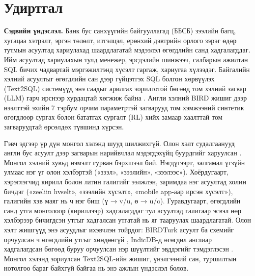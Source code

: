 
\titleformat{\section}{\Large\bfseries\filcenter}{}{0pt}{}
\section*{Удиртгал}
\titleformat{\section}{\Large\bfseries\raggedright}{\thesection}{1em}{}

\textbf{Сэдвийн үндэслэл.} Банк бус санхүүгийн байгууллагад (ББСБ) зээлийн багц, хугацаа хэтрэлт, эргэн төлөлт,
итгэлцэл, ерөнхий дэвтрийн орлого зэрэг өдөр тутмын асуултад хариулахад шаардлагатай мэдээлэл өгөгдлийн санд
хадгалагддаг. Ийм асуултад
хариулахын тулд менежер, эрсдэлийн шинжээч, салбарын ажилтан SQL бичих чадвартай мэргэжилтэнд хүсэлт гаргаж,
хариугаа хүлээдэг. Байгалийн хэлний асуултыг өгөгдлийн сан дээр гүйцэтгэх SQL болгон хөрвүүлэх (Text2SQL)
системүүд энэ саадыг арилгах зорилготой бөгөөд том хэлний загвар (LLM) гарч ирснээр хурдацтай хөгжиж байна
\cite{shi_2025_survey_llm_text2sql}. Англи хэлний BIRD жишиг \cite{li_2023_bird} дээр нээлттэй эхийн 7 тэрбум
орчим параметртэй загварууд том хэмжээний синтетик өгөгдлөөр сургах \cite{li_2025_omnisql} болон бататгах сургалт
(RL) хийх \cite{yao_2025_arctic_text2sql_r1} замаар хаалттай том загваруудтай өрсөлдөх түвшинд хүрсэн.

Гэвч эдгээр үр дүн монгол хэлэнд шууд шилжихгүй. Олон хэлт судалгаанууд англи бус асуулт дээр загварын нарийвчлал
мэдэгдэхүйц буурдгийг харуулсан \cite{dou_2023_multispider, pham_2026_multispider2}. Монгол хэлний хувьд нэмэлт
гурван бэрхшээл бий. Нэгдүгээрт, залгамал үгзүйн улмаас нэг үг олон хэлбэртэй («зээл», «зээлийн», «зээлээс»).
Хоёрдугаарт, хэрэглэгчид кирилл болон латин галигийг ээлжлэн, заримдаа нэг асуултад холин бичдэг («zeeliin hvselt»,
«зээлийн хүсэлт», «mobile app-аар ирсэн хүсэлт»), галигийн хэв маяг нь ч нэг биш (ү → v/u, ө → u/o). Гуравдугаарт,
өгөгдлийн санд утга монголоор (кириллээр) хадгалагддаг тул асуултад галигаар эсвэл өөр хэлбэрээр бичигдсэн утгыг
хадгалсан утгатай нь яг тааруулах шаардлагатай. Олон хэлт жишгүүд энэ асуудлыг ихэвчлэн тойрдог: BIRDTurk асуулт ба
схемийг орчуулсан ч өгөгдлийн утгыг хөндөөгүй \cite{aktas_2026_birdturk}, IndicDB-д өгөгдөл англиар хадгалагдсан
бөгөөд буруу орчуулсан нэр шүүлтийг эвддэгийг тэмдэглэсэн \cite{dawar_2026_indicdb}. Монгол хэлэнд зориулсан
Text2SQL-ийн жишиг, үнэлгээний сан, туршилтын нотолгоо бараг байхгүй байгаа нь энэ ажлын үндэслэл болов.


